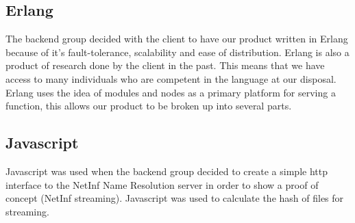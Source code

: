 \subsection{Erlang}
The backend group decided with the client to have our product written in Erlang because of it's fault-tolerance, scalability and ease of distribution. Erlang is also a product of research done by the client in the past. This means that we have access to many individuals who are competent in the language at our disposal.
Erlang uses the idea of modules and nodes as a primary platform for serving a function, this allows our product to be broken up into several parts.
\subsection{Javascript}

Javascript was used when the backend group decided to create a simple http interface to the NetInf Name Resolution server in order to show a proof of concept (NetInf streaming). Javascript was used to calculate the hash of files for streaming.